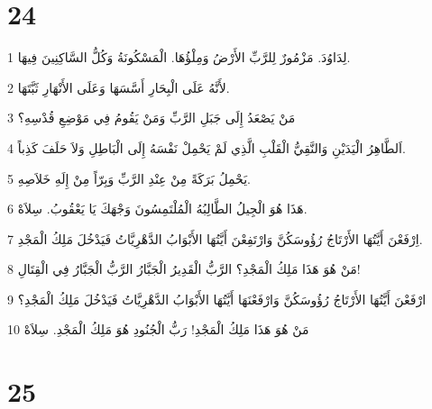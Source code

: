 \chapter{24}

\par 1 لِدَاوُدَ. مَزْمُورٌ لِلرَّبِّ الأَرْضُ وَمِلْؤُهَا. الْمَسْكُونَةُ وَكُلُّ السَّاكِنِينَ فِيهَا.
\par 2 لأَنَّهُ عَلَى الْبِحَارِ أَسَّسَهَا وَعَلَى الأَنْهَارِ ثَبَّتَهَا.
\par 3 مَنْ يَصْعَدُ إِلَى جَبَلِ الرَّبِّ وَمَنْ يَقُومُ فِي مَوْضِعِ قُدْسِهِ؟
\par 4 اَلطَّاهِرُ الْيَدَيْنِ وَالنَّقِيُّ الْقَلْبِ الَّذِي لَمْ يَحْمِلْ نَفْسَهُ إِلَى الْبَاطِلِ وَلاَ حَلَفَ كَذِباً.
\par 5 يَحْمِلُ بَرَكَةً مِنْ عِنْدِ الرَّبِّ وَبِرّاً مِنْ إِلَهِ خَلاَصِهِ.
\par 6 هَذَا هُوَ الْجِيلُ الطَّالِبُهُ الْمُلْتَمِسُونَ وَجْهَكَ يَا يَعْقُوبُ. سِلاَهْ.
\par 7 اِرْفَعْنَ أَيَّتُهَا الأَرْتَاجُ رُؤُوسَكُنَّ وَارْتَفِعْنَ أَيَّتُهَا الأَبْوَابُ الدَّهْرِيَّاتُ فَيَدْخُلَ مَلِكُ الْمَجْدِ.
\par 8 مَنْ هُوَ هَذَا مَلِكُ الْمَجْدِ؟ الرَّبُّ الْقَدِيرُ الْجَبَّارُ الرَّبُّ الْجَبَّارُ فِي الْقِتَالِ!
\par 9 ارْفَعْنَ أَيَّتُهَا الأَرْتَاجُ رُؤُوسَكُنَّ وَارْفَعْنَهَا أَيَّتُهَا الأَبْوَابُ الدَّهْرِيَّاتُ فَيَدْخُلَ مَلِكُ الْمَجْدِ؟
\par 10 مَنْ هُوَ هَذَا مَلِكُ الْمَجْدِ! رَبُّ الْجُنُودِ هُوَ مَلِكُ الْمَجْدِ. سِلاَهْ

\chapter{25}


